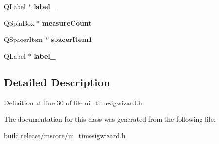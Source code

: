 \begin{DoxyCompactItemize}
Q\+Label $\ast$ {\bfseries label\+\_}
\item 
\mbox{\label{class_ui___timesig_wizard_a92ad13c21eb00a22d84ccf34e0f52916}} 
Q\+Spin\+Box $\ast$ {\bfseries measure\+Count}
\item 
\mbox{\label{class_ui___timesig_wizard_aa34ad50b98676282af2840d08021d2de}} 
Q\+Spacer\+Item $\ast$ {\bfseries spacer\+Item1}
\item 
\mbox{\label{class_ui___timesig_wizard_af13c0199687911e4f17c042674e2693d}} 
Q\+Label $\ast$ {\bfseries label\+\_}
\end{DoxyCompactItemize}


\subsection{Detailed Description}


Definition at line 30 of file ui\+\_\+timesigwizard.\+h.



The documentation for this class was generated from the following file\+:\begin{DoxyCompactItemize}
\item 
build.\+release/mscore/ui\+\_\+timesigwizard.\+h\end{DoxyCompactItemize}

